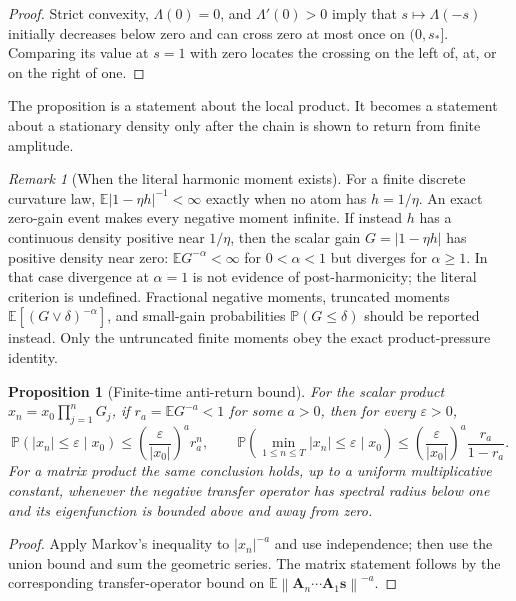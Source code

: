 \documentclass[10pt]{article}
\newtheorem{proposition}[theorem]{Proposition}
\theoremstyle{definition}
\theoremstyle{remark}
\newtheorem{remark}[theorem]{Remark}
\newcommand{\E}{\mathbb E}
\newcommand{\Pp}{\mathbb P}
\newcommand{\norm}[1]{\left\lVert#1\right\rVert}
\newcommand{\svec}{\mathbf s}
\newcommand{\Avec}{\mathbf A}
\begin{document}
\begin{proof}
Strict convexity, $\Lambda(0)=0$, and $\Lambda'(0)>0$ imply that
$s\mapsto\Lambda(-s)$ initially decreases below zero and can cross zero at
most once on $(0,s_*]$.  Comparing its value at $s=1$ with zero locates the
crossing on the left of, at, or on the right of one.
\end{proof}

The proposition is a statement about the local product.  It becomes a
statement about a stationary density only after the chain is shown to return
from finite amplitude.

\begin{remark}[When the literal harmonic moment exists]
For a finite discrete curvature law,
$\E|1-\eta h|^{-1}<\infty$ exactly when no atom has $h=1/\eta$.
An exact zero-gain event makes every negative moment infinite.  If instead
$h$ has a continuous density positive near $1/\eta$, then the scalar gain
$G=|1-\eta h|$ has positive density near zero:
$\E G^{-\alpha}<\infty$ for $0<\alpha<1$ but diverges for
$\alpha\ge1$.  In that case divergence at $\alpha=1$ is not evidence of
post-harmonicity; the literal criterion is undefined.  Fractional negative
moments, truncated moments $\E[(G\vee\delta)^{-\alpha}]$, and small-gain
probabilities $\Pp(G\le\delta)$ should be reported instead.  Only the
untruncated finite moments obey the exact product-pressure identity.
\end{remark}

\begin{proposition}[Finite-time anti-return bound]
\label{prop:anti-return}
For the scalar product $x_n=x_0\prod_{j=1}^nG_j$, if
$r_a=\E G^{-a}<1$ for some $a>0$, then for every $\varepsilon>0$,
\begin{equation}
 \Pp(|x_n|\le\varepsilon\mid x_0)
 \le \left(\frac{\varepsilon}{|x_0|}\right)^a r_a^n,
 \qquad
 \Pp\!\left(\min_{1\le n\le T}|x_n|\le\varepsilon\mid x_0\right)
 \le \left(\frac{\varepsilon}{|x_0|}\right)^a
 \frac{r_a}{1-r_a}.
 \label{eq:anti-return}
\end{equation}
For a matrix product the same conclusion holds, up to a uniform multiplicative
constant, whenever the negative transfer operator has spectral radius below
one and its eigenfunction is bounded above and away from zero.
\end{proposition}

\begin{proof}
Apply Markov's inequality to $|x_n|^{-a}$ and use independence; then use the
union bound and sum the geometric series.  The matrix statement follows by
the corresponding transfer-operator bound on
$\E\norm{\Avec_n\cdots\Avec_1\svec}^{-a}$.
\end{proof}
\end{document}
